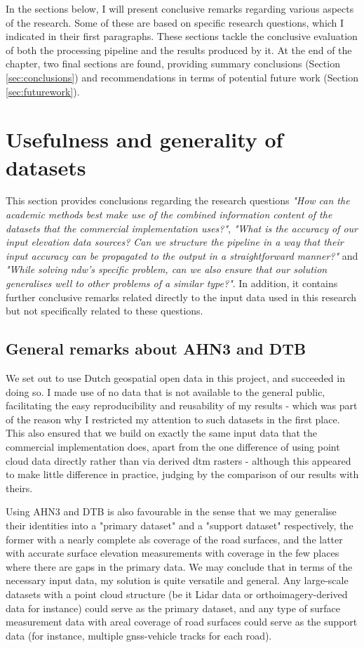In the sections below, I will present conclusive remarks regarding various aspects of the research. Some of these are based on specific research questions, which I indicated in their first paragraphs. These sections tackle the conclusive evaluation of both the processing pipeline and the results produced by it. At the end of the chapter, two final sections are found, providing summary conclusions (Section \ref{sec:conclusions}) and recommendations in terms of potential future work (Section \ref{sec:futurework}).

\section{Usefulness and generality of datasets}
\label{sec:usefulness}

This section provides conclusions regarding the research questions \textit{"How can the academic methods best make use of the combined information content of the datasets that the commercial implementation uses?"}, \textit{"What is the accuracy of our input elevation data sources? Can we structure the pipeline in a way that their input accuracy can be propagated to the output in a straightforward manner?"} and \textit{"While solving \ac{ndw}'s specific problem, can we also ensure that our solution generalises well to other problems of a similar type?"}. In addition, it contains further conclusive remarks related directly to the input data used in this research but not specifically related to these questions.

\subsection{General remarks about AHN3 and DTB}
\label{sub:usefulnessgeneral}

We set out to use Dutch geospatial open data in this project, and succeeded in doing so. I made use of no data that is not available to the general public, facilitating the easy reproducibility and reusability of my results - which was part of the reason why I restricted my attention to such datasets in the first place. This also ensured that we build on exactly the same input data that the commercial implementation does, apart from the one difference of using point cloud data directly rather than via derived \ac{dtm} rasters - although this appeared to make little difference in practice, judging by the comparison of our results with theirs.

Using AHN3 and DTB is also favourable in the sense that we may generalise their identities into a "primary dataset" and a "support dataset" respectively, the former with a nearly complete \ac{als} coverage of the road surfaces, and the latter with accurate surface elevation measurements with coverage in the few places where there are gaps in the primary data. We may conclude that in terms of the necessary input data, my solution is quite versatile and general. Any large-scale datasets with a point cloud structure (be it Lidar data or orthoimagery-derived data for instance) could serve as the primary dataset, and any type of surface measurement data with areal coverage of road surfaces could serve as the support data (for instance, multiple \ac{gnss}-vehicle tracks for each road).

